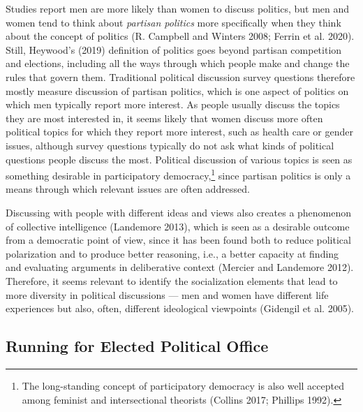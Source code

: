 \documentclass[
  letterpaper,
  DIV=11,
  numbers=noendperiod]{scrreprt}
\begin{document}
Studies report men are more likely than women to discuss politics, but
men and women tend to think about \emph{partisan politics} more
specifically when they think about the concept of politics (R. Campbell
and Winters 2008; Ferrin et al. 2020). Still, Heywood's (2019)
definition of politics goes beyond partisan competition and elections,
including all the ways through which people make and change the rules
that govern them. Traditional political discussion survey questions
therefore mostly measure discussion of partisan politics, which is one
aspect of politics on which men typically report more interest. As
people usually discuss the topics they are most interested in, it seems
likely that women discuss more often political topics for which they
report more interest, such as health care or gender issues, although
survey questions typically do not ask what kinds of political questions
people discuss the most. Political discussion of various topics is seen
as something desirable in participatory democracy,\footnote{The
  long-standing concept of participatory democracy is also well accepted
  among feminist and intersectional theorists (Collins 2017; Phillips
  1992).} since partisan politics is only a means through which relevant
issues are often addressed.

Discussing with people with different ideas and views also creates a
phenomenon of collective intelligence (Landemore 2013), which is seen as
a desirable outcome from a democratic point of view, since it has been
found both to reduce political polarization and to produce better
reasoning, i.e., a better capacity at finding and evaluating arguments
in deliberative context (Mercier and Landemore 2012). Therefore, it
seems relevant to identify the socialization elements that lead to more
diversity in political discussions --- men and women have different life
experiences but also, often, different ideological viewpoints (Gidengil
et al. 2005).

\subsection{Running for Elected Political
Office}\label{running-for-elected-political-office}
\end{document}
